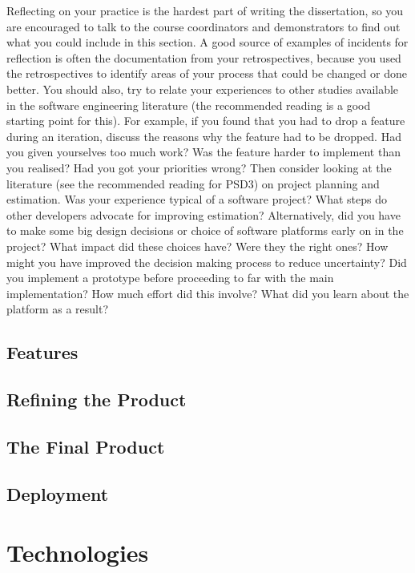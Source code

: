 \documentclass{l3proj}
\begin{document}
Reflecting on your practice is the hardest part of writing the dissertation, so you are encouraged to talk to the course coordinators and demonstrators to find out what you could include in this section. A good source of examples of incidents for reflection is often the documentation from your retrospectives, because you used the retrospectives to identify areas of your process that could be changed or done better. You should also, try to relate your experiences to other studies available in the software engineering literature (the recommended reading is a good starting point for this). For example, if you found that you had to drop a feature during an iteration, discuss the reasons why the feature had to be dropped. Had you given yourselves too much work? Was the feature harder to implement than you realised? Had you got your priorities wrong? Then consider looking at the literature (see the recommended reading for PSD3) on project planning and estimation. Was your experience typical of a software project? What steps do other developers advocate for improving estimation? Alternatively, did you have to make some big design decisions or choice of software platforms early on in the project? What impact did these choices have? Were they the right ones? How might you have improved the decision making process to reduce uncertainty? Did you implement a prototype before proceeding to far with the main implementation? How much effort did this involve? What did you learn about the platform as a result?

\subsection{Features}

\subsection{Refining the Product}

\subsection{The Final Product}

\subsection{Deployment}


\section{Technologies}
\end{document}

